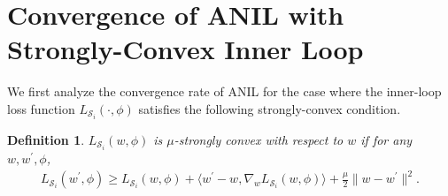 \documentclass{osudissert96}
\newtheorem{definition}{Definition}
\begin{document}

\section{Convergence of ANIL with Strongly-Convex Inner Loop}\label{se:strong-convex}
We first analyze the convergence rate of ANIL for the case where the inner-loop loss function $L_{\mathcal{S}_i}(\cdot,\phi)$ satisfies the following strongly-convex condition. 
\begin{definition}
$L_{\mathcal{S}_i}(w,\phi)$ is $\mu$-strongly convex with respect to $w$ if for any $w,w^\prime,\phi$,
 \begin{align*}
 L_{\mathcal{S}_i}(w^\prime,\phi) \geq L_{\mathcal{S}_i}(w,\phi) + \big\langle w^\prime -w , \nabla_w L_{\mathcal{S}_i}(w,\phi) \big\rangle + \frac{\mu}{2} \|w-w^\prime\|^2.
 \end{align*} 
 \end{definition}
\end{document}
